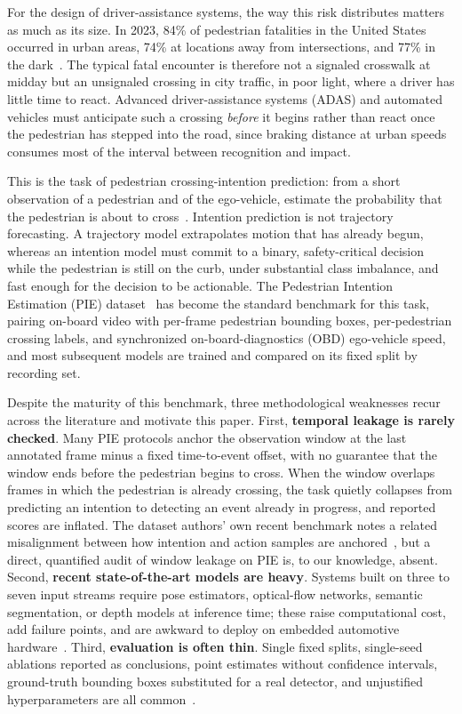 \documentclass[mti,article,submit,moreauthors]{Definitions/mdpi}
\begin{document}
For the design of driver-assistance systems, the way this risk distributes matters as much as its size. In 2023, 84\% of pedestrian fatalities in the United States occurred in urban areas, 74\% at locations away from intersections, and 77\% in the dark~\citep{nhtsa2025pedestrians}. The typical fatal encounter is therefore not a signaled crosswalk at midday but an unsignaled crossing in city traffic, in poor light, where a driver has little time to react. Advanced driver-assistance systems (ADAS) and automated vehicles must anticipate such a crossing \emph{before} it begins rather than react once the pedestrian has stepped into the road, since braking distance at urban speeds consumes most of the interval between recognition and impact.

This is the task of pedestrian crossing-intention prediction: from a short observation of a pedestrian and of the ego-vehicle, estimate the probability that the pedestrian is about to cross~\citep{rasouli2019pie,kotseruba2021benchmark}. Intention prediction is not trajectory forecasting. A trajectory model extrapolates motion that has already begun, whereas an intention model must commit to a binary, safety-critical decision while the pedestrian is still on the curb, under substantial class imbalance, and fast enough for the decision to be actionable. The Pedestrian Intention Estimation (PIE) dataset~\citep{rasouli2019pie} has become the standard benchmark for this task, pairing on-board video with per-frame pedestrian bounding boxes, per-pedestrian crossing labels, and synchronized on-board-diagnostics (OBD) ego-vehicle speed, and most subsequent models are trained and compared on its fixed split by recording set.

Despite the maturity of this benchmark, three methodological weaknesses recur across the literature and motivate this paper. First, \textbf{temporal leakage is rarely checked}. Many PIE protocols anchor the observation window at the last annotated frame minus a fixed time-to-event offset, with no guarantee that the window ends before the pedestrian begins to cross. When the window overlaps frames in which the pedestrian is already crossing, the task quietly collapses from predicting an intention to detecting an event already in progress, and reported scores are inflated. The dataset authors' own recent benchmark notes a related misalignment between how intention and action samples are anchored~\citep{rasouli2024diving}, but a direct, quantified audit of window leakage on PIE is, to our knowledge, absent. Second, \textbf{recent state-of-the-art models are heavy}. Systems built on three to seven input streams require pose estimators, optical-flow networks, semantic segmentation, or depth models at inference time; these raise computational cost, add failure points, and are awkward to deploy on embedded automotive hardware~\citep{azarmi2025pipnet,xie2025gtranspdm}. Third, \textbf{evaluation is often thin}. Single fixed splits, single-seed ablations reported as conclusions, point estimates without confidence intervals, ground-truth bounding boxes substituted for a real detector, and unjustified hyperparameters are all common~\citep{rasouli2024diving,azarmi2024featureimportance}.
\end{document}
